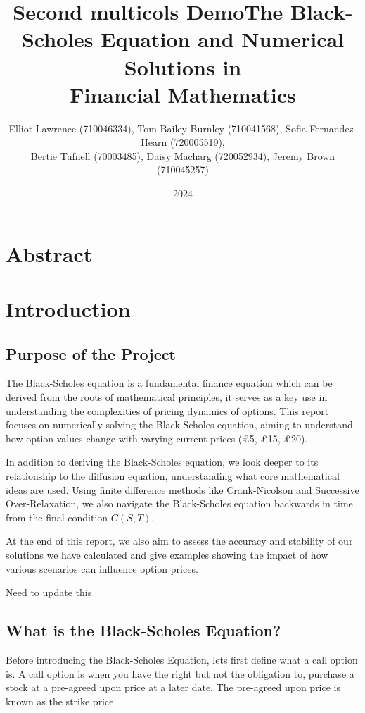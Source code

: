 \documentclass[11pt]{article}
\title{Second multicols Demo}
\title{The Black-Scholes Equation and Numerical Solutions in \\ Financial Mathematics}
\author{Elliot Lawrence (710046334), Tom Bailey-Burnley (710041568), Sofia Fernandez-Hearn (720005519),\\
Bertie Tufnell (70003485), Daisy Macharg (720052934), Jeremy Brown (710045257)}
\date{2024}
\begin{document}
\maketitle

\section{Abstract}
 
\newpage

\tableofcontents

\newpage
\section{Introduction}

\subsection{Purpose of the Project}

The Black-Scholes equation is a fundamental finance equation which can be derived from the roots of mathematical principles, it serves as a key use in understanding the complexities of pricing dynamics of options. This report focuses on numerically solving the Black-Scholes equation, aiming to understand how option values change with varying current prices (£5, £15, £20). 

In addition to deriving the Black-Scholes equation, we look deeper to its relationship to the diffusion equation, understanding what core mathematical ideas are used.  Using finite difference methods like Crank-Nicolson and Successive Over-Relaxation, we also navigate the Black-Scholes equation backwards in time from the final condition \(C(S, T)\).

At the end of this report, we also aim to assess the accuracy and stability of our solutions we have calculated and give examples showing the impact of how various scenarios can influence option prices.

Need to update this

\subsection{What is the Black-Scholes Equation?}

Before introducing the Black-Scholes Equation, lets first define what a call option is. A call option is when you have the right but not the obligation to, purchase a stock at a pre-agreed upon price at a later date. The pre-agreed upon price is known as the strike price.
\end{document}
